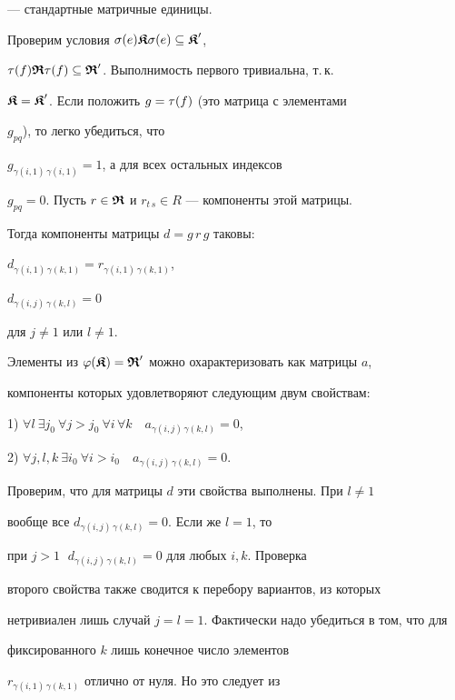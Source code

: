 --- стандартные матричные единицы.


Проверим условия $\sigma(e)\boldsymbol{\frak K}\sigma(e)\subseteq \boldsymbol{\frak K}'$,


$\tau(f)\boldsymbol{\frak R}\tau(f)\subseteq \boldsymbol{\frak R}'$. Выполнимость первого тривиальна, т.\,к.


$\boldsymbol{\frak K}=\boldsymbol{\frak K}'$. Если положить $g=\tau(f)$ (это матрица с элементами


$g_{pq}$), то легко убедиться, что


$g_{\gamma (i,1)\,\gamma (i,1)}=1$, а для всех остальных индексов


$g_{pq}=0$. Пусть $r\in\boldsymbol{\frak R}$ и $r_{t\,s}\in R$ --- компоненты этой матрицы.


Тогда компоненты матрицы $d=g\, r\, g$ таковы:


$d_{\gamma (i,1)\,\gamma (k,1)}=r_{\gamma (i,1)\,\gamma (k,1)}$,


$d_{\gamma (i,j)\,\gamma (k,l)}=0$


для $j\ne 1$ или $l\ne 1$.


Элементы из $\varphi(\boldsymbol{\frak K})=\boldsymbol{\frak R}'$ можно охарактеризовать как матрицы $a$,


компоненты которых удовлетворяют следующим двум свойствам:





1) $\forall l \ \exists j_0 \ \forall j>j_0 \


\forall i \, \forall k \quad a_{\gamma (i,j)\,\gamma (k,l)}=0$,





2) $\forall j,l,k \ \exists i_0 \ \forall i>i_0 \quad


a_{\gamma (i,j)\,\gamma (k,l)}=0 $.





Проверим, что для матрицы $d$ эти свойства выполнены. При $l\ne 1$


вообще все $d_{\gamma (i,j)\,\gamma (k,l)}=0 $. Если же $l=1$, то


при $j>1\;$ $d_{\gamma (i,j)\,\gamma (k,l)}=0 $ для любых $i,k$. Проверка


второго свойства также сводится к перебору вариантов, из которых


нетривиален лишь случай $j=l=1$. Фактически надо убедиться в том, что для


фиксированного $k$ лишь конечное число элементов


$r_{\gamma (i,1)\,\gamma (k,1)}$ отлично от нуля. Но это следует из


